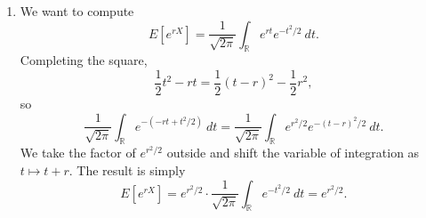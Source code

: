 \documentclass[10pt]{article}
\newcommand\E[1]{E[#1]}
\begin{document}
\begin{enumerate}
            \item We want to compute \[
                \E{e^{rX}} = \frac{1}{\sqrt{2\pi}} \int_{\mathbb{R}}e^{rt} e^{-t^2
                / 2}\:dt.
            \] Completing the square, \[
                \frac{1}{2}t^2 - rt = \frac{1}{2}(t - r)^2 - \frac{1}{2}r^2,
            \] so \[
                \frac{1}{\sqrt{2\pi}}\int_{\mathbb{R}}e^{-(-rt + t^2 / 2)}\:dt =
                \frac{1}{\sqrt{2\pi}}\int_{\mathbb{R}} e^{r^2 / 2}e^{-(t - r)^2 /
                2}\:dt.
            \] We take the factor of $e^{r^2 / 2}$ outside and shift the variable of
            integration as $t \mapsto t + r$. The result is simply \[
                \E{e^{rX}} = e^{r^2 /2}\cdot
                \frac{1}{\sqrt{2\pi}}\int_{\mathbb{R}}e^{-t^2 / 2}\:dt = e^{r^2 /
                2}.
            \] 
        \end{enumerate}

        
\end{document}
